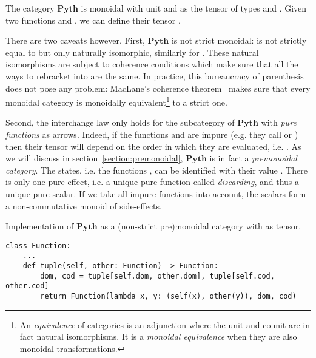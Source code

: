 \begin{example}
The category $\mathbf{Pyth}$ is monoidal with unit \py{()} and  as the tensor of types  and .
Given two functions  and , we can define their tensor .

There are two caveats however.
First, $\mathbf{Pyth}$ is not strict monoidal:  is not strictly equal to  but only naturally isomorphic, similarly for .
These natural isomorphisms are subject to coherence conditions which make sure that all the ways to rebracket  into  are the same.
In practice, this bureaucracy of parenthesis does not pose any problem: MacLane's coherence theorem~\cite[VII]{MacLane71} makes sure that every monoidal category is monoidally equivalent\footnote
{An \emph{equivalence} of categories is an adjunction where the unit and counit are in fact natural isomorphisms.
It is a \emph{monoidal equivalence} when they are also monoidal transformations.} to a strict one.

Second, the interchange law only holds for the subcategory of $\mathbf{Pyth}$ with \emph{pure functions} as arrows.
Indeed, if the functions  and  are impure (e.g. they call  or ) then their tensor  will depend on the order in which they are evaluated, i.e. .
As we will discuss in section~\ref{section:premonoidal}, $\mathbf{Pyth}$ is in fact a \emph{premonoidal category}.
The states, i.e. the functions , can be identified with their value .
There is only one pure effect, i.e. a unique pure function  called \emph{discarding}, and thus a unique pure scalar.
If we take all impure functions into account, the scalars form a non-commutative monoid of side-effects.
\end{example}

\begin{python}
{\normalfont Implementation of $\mathbf{Pyth}$ as a (non-strict pre)monoidal category with  as tensor.}

\begin{verbatim}
class Function:
    ...
    def tuple(self, other: Function) -> Function:
        dom, cod = tuple[self.dom, other.dom], tuple[self.cod, other.cod]
        return Function(lambda x, y: (self(x), other(y)), dom, cod)
\end{verbatim}
\end{python}

